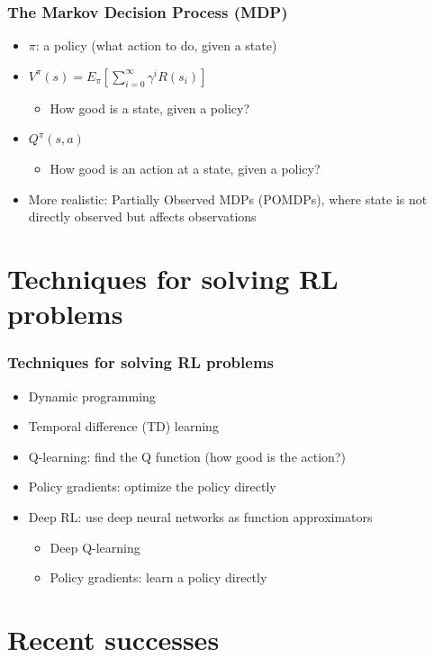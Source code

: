 \documentclass{beamer}
\begin{document}
\begin{frame}
  \frametitle{The Markov Decision Process (MDP)}
  \begin{itemize}
    \item $\pi$: a policy (what action to do, given a state)
    \item $V^\pi(s) = E_\pi[\sum_{i=0}^\infty \gamma^i R(s_i)]$
    \begin{itemize}
      \item How good is a state, given a policy?
    \end{itemize}
  \item $Q^\pi(s, a)$
    \begin{itemize}
      \item How good is an action at a state, given a policy?
    \end{itemize}
  \item More realistic: Partially Observed MDPs (POMDPs), where state is not directly observed but affects observations
  \end{itemize}

\end{frame}

\section{Techniques for solving RL problems}

\begin{frame}
  \frametitle{Techniques for solving RL problems}
  \begin{itemize}
      \item Dynamic programming
      \item Temporal difference (TD) learning
      \item Q-learning: find the Q function (how good is the action?)
      \item Policy gradients: optimize the policy directly
      \item Deep RL: use deep neural networks as function approximators

        \begin{itemize}
          \item Deep Q-learning
          \item Policy gradients: learn a policy directly
        \end{itemize}
  \end{itemize}
\end{frame}

\section{Recent successes}
\end{document}
